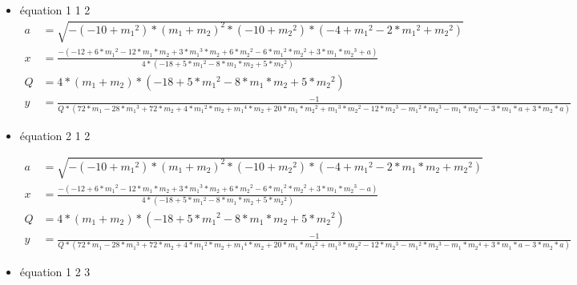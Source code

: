 \documentclass[a4paper, 8pt]{article}
\begin{document}
\begin{itemize}[label=$\bullet$]
		
\item équation 1 1 2
\begin{equation} \label{3}
	\begin{split}
	a & = \sqrt{-(-10+{{m}_{1}}^{2})*{({m}_{1}+{m}_{2})}^{2}*(-10+{{m}_{2}}^{2})*(-4+{{m}_{1}}^{2}-2*{{m}_{1}}^{2}+{{m}_{2}}^{2})}\\
	x & = \frac{-(-12+6*{{m}_{1}}^{2}-12*{m}_{1}*{m}_{2}+3*{{m}_{1}}^{3}*{m}_{2}+6*{{m}_{2}}^{2}-6*{{m}_{1}}^{2}*{{m}_{2}}^{2}+3*{m}_{1}*{{m}_{2}}^{3}+a)}{4*(-18+5*{{m}_{1}}^{2}-8*{m}_{1}*{m}_{2}+5*{{m}_{2}}^{2})} \\
	Q & = 4*({m}_{1}+{m}_{2})*(-18+5*{{m}_{1}}^{2}-8*{m}_{1}*{m}_{2}+5*{{m}_{2}}^{2})\\
	y & =  \frac{-1}{Q*(72*{m}_{1}-28*{{m}_{1}}^{3}+72*{m}_{2}+4*{{m}_{1}}^{2}*{m}_{2}+{{m}_{1}}^{4}*{m}_{2}+20*{m}_{1}*{{m}_{2}}^{2}+{{m}_{1}}^{3}*{{m}_{2}}^{2}-12*{{m}_{2}}^{3}-{{m}_{1}}^{2}*{{m}_{2}}^{3}-{m}_{1}*{{m}_{2}}^{4}-3*{m}_{1}*a+3*{m}_{2}*a)}
	\end{split}
	\end{equation}

\item équation 2 1 2

   \begin{equation} \label{4}
   	\begin{split}
    a & = \sqrt{-(-10+{{m}_{1}}^{2})*{({m}_{1}+{m}_{2})}^{2}*(-10+{{m}_{2}}^{2})*(-4+{{m}_{1}}^{2}-2*{m}_{1}*{m}_{2}+{{m}_{2}}^{2})}\\
   	x & = \frac{-(-12+6*{{m}_{1}}^{2}-12*{m}_{1}*{m}_{2}+3*{{m}_{1}}^{3}*{m}_{2}+6*{{m}_{2}}^{2}-6*{{m}_{1}}^{2}*{{m}_{2}}^{2}+3*{m}_{1}*{{m}_{2}}^{3}-a)}{4*(-18+5*{{m}_{1}}^{2}-8*{m}_{1}*{m}_{2}+5*{{m}_{2}}^{2})} \\
   	Q & = 4*({m}_{1}+{m}_{2})*(-18+5* {{m}_{1}}^{2}-8*{m}_{1}*{m}_{2}+5*{{m}_{2}}^{2})\\
   	y &  = \frac{-1}{Q*(72*{m}_{1}-28*{{m}_{1}}^{3}+72*{m}_{2}+4*{{m}_{1}}^{2}*{m}_{2}+{{m}_{1}}^{4}*{m}_{2}+20*{m}_{1}*{{m}_{2}}^{2}+{{m}_{1}}^{3}*{{m}_{2}}^{2}-12*{{m}_{2}}^{3}-{{m}_{1}}^{2}* {{m}_{2}}^{3}-{m}_{1}*{{m}_{2}}^{4}+3*{m}_{1}*a-3*{m}_{2}*a)}
   	\end{split}
   	\end{equation}

\item équation 1 2 3


\end{itemize}
\end{document}
